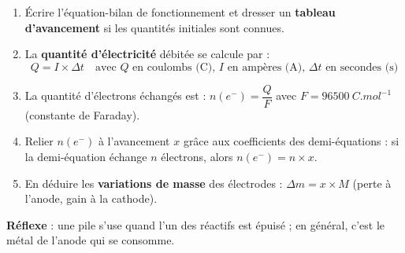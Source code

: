 \documentclass[11pt]{article}
\begin{document}
\begin{methode}
\begin{enumerate}
\item Écrire l'équation-bilan de fonctionnement et dresser un \textbf{tableau d'avancement} si les quantités initiales sont connues.
\item La \textbf{quantité d'électricité} débitée se calcule par :
\[ Q = I \times \Delta t \quad \text{avec } Q \text{ en coulombs (C), } I \text{ en ampères (A), } \Delta t \text{ en secondes (s)} \]
\item La quantité d'électrons échangés est : $n(e^-) = \dfrac{Q}{F}$ avec $F = \SI{96500}{C.mol^{-1}}$ (constante de Faraday).
\item Relier $n(e^-)$ à l'avancement $x$ grâce aux coefficients des demi-équations : si la demi-équation échange $n$ électrons, alors $n(e^-) = n \times x$.
\item En déduire les \textbf{variations de masse} des électrodes : $\Delta m = x \times M$ (perte à l'anode, gain à la cathode).
\end{enumerate}
\textbf{Réflexe} : une pile s'use quand l'un des réactifs est épuisé ; en général, c'est le métal de l'anode qui se consomme.
\end{methode}
\end{document}
